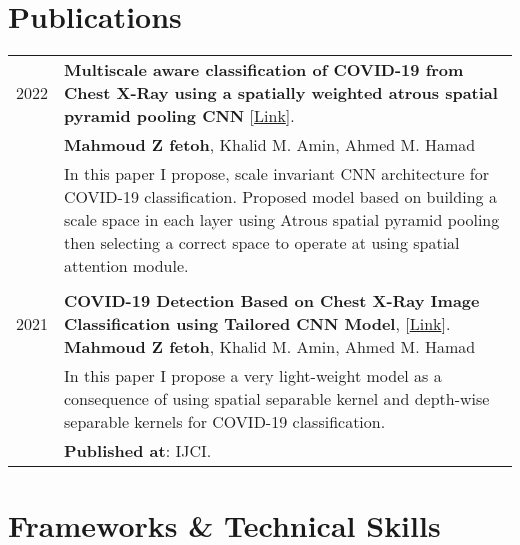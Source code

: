\documentclass[a4paper,10pt]{article}
\begin{document}
\section{\textbf{Publications}}  
    \begin{longtable}{r p{16cm}}
        2022  & \textbf{Multiscale aware classification of COVID-19 from Chest X-Ray using a spatially weighted atrous spatial pyramid pooling CNN} [\href{https://www.researchsquare.com/article/rs-3043485/v1}{Link}].\\& \textbf{Mahmoud Z fetoh}, Khalid M. Amin, Ahmed M. Hamad \\&
        In this paper I propose, scale invariant CNN architecture for COVID-19 classification. Proposed model based on building a scale space in each layer using Atrous spatial pyramid pooling then selecting a correct space to operate at using spatial attention module.\\
        &\\ 
        2021  & \textbf{COVID-19 Detection Based on Chest X-Ray Image Classification using Tailored CNN Model}, [\href{https://scholar.google.com/scholar?cluster=12675761567539204826&hl=en&as_sdt=0,5}{Link}].
        \textbf{Mahmoud Z fetoh}, Khalid M. Amin, Ahmed M. Hamad \\&
        In this paper I propose a very light-weight model as a consequence of using spatial separable kernel and depth-wise separable kernels for COVID-19 classification.\\&
        \textbf{Published at}: IJCI.  
        \\
\end{longtable}

\section{\textbf{Frameworks \& Technical Skills}}
\end{document}

